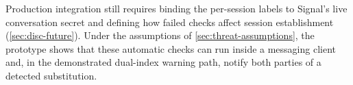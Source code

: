 Production integration still requires binding the per-session labels to Signal's live conversation
secret and defining how failed checks affect session establishment (\cref{sec:disc-future}). Under
the assumptions of \cref{sec:threat-assumptions}, the prototype shows that these automatic checks can
run inside a messaging client and, in the demonstrated dual-index warning path, notify both parties of
a detected substitution.
